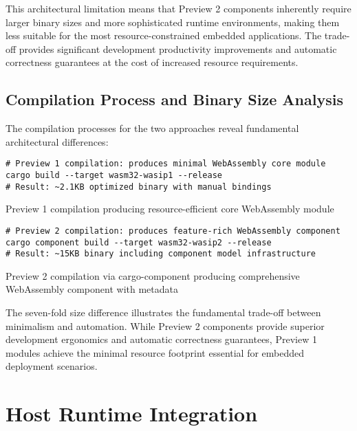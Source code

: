 This architectural limitation means that Preview 2 components inherently require larger binary sizes and more sophisticated runtime environments, making them less suitable for the most resource-constrained embedded applications. The trade-off provides significant development productivity improvements and automatic correctness guarantees at the cost of increased resource requirements.

\subsection{Compilation Process and Binary Size Analysis}

The compilation processes for the two approaches reveal fundamental architectural differences:

\begin{listing}[H]
\begin{verbatim}
# Preview 1 compilation: produces minimal WebAssembly core module
cargo build --target wasm32-wasip1 --release
# Result: ~2.1KB optimized binary with manual bindings
\end{verbatim}
\caption{Preview 1 compilation producing resource-efficient core WebAssembly module}
\label{lst:preview1-compilation}
\end{listing}

\begin{listing}[H]
\begin{verbatim}
# Preview 2 compilation: produces feature-rich WebAssembly component
cargo component build --target wasm32-wasip2 --release
# Result: ~15KB binary including component model infrastructure
\end{verbatim}
\caption{Preview 2 compilation via cargo-component producing comprehensive WebAssembly component with metadata}
\label{lst:preview2-compilation}
\end{listing}

The seven-fold size difference illustrates the fundamental trade-off between minimalism and automation. While Preview 2 components provide superior development ergonomics and automatic correctness guarantees, Preview 1 modules achieve the minimal resource footprint essential for embedded deployment scenarios.

\section{Host Runtime Integration}
\label{sec:host-runtime-integration}

